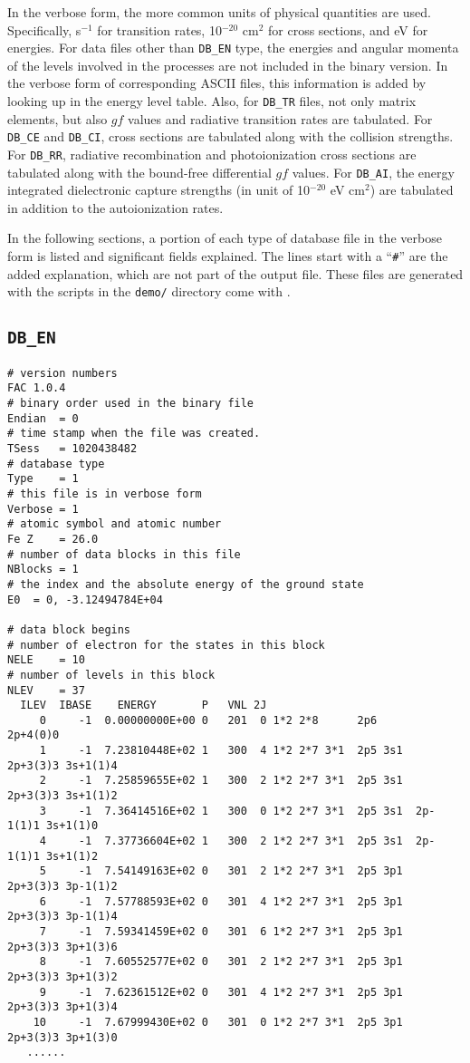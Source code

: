 In the verbose form, the more common units of physical quantities are
used. Specifically, s$^{-1}$ for transition rates, 10$^{-20}$ cm$^2$ for cross
sections, and eV for energies. For data files other than \texttt{DB\_EN} type,
the energies and angular momenta of the levels involved in the processes are
not included in the binary version. In the verbose form of corresponding ASCII
files, this information is added by looking up in the energy level
table. Also, for \texttt{DB\_TR} files, not only matrix elements, but also
$gf$ values and radiative transition rates are tabulated. For \texttt{DB\_CE}
and \texttt{DB\_CI}, cross
sections are tabulated along with the collision strengths. For \texttt{DB\_RR},
radiative recombination and photoionization cross sections are tabulated along
with the bound-free differential $gf$ values. For \texttt{DB\_AI}, the energy
integrated dielectronic capture strengths (in unit of 10$^{-20}$ eV cm$^2$)
are tabulated in addition to the autoionization rates.

In the following sections, a portion of each type of database file in the
verbose form is listed and significant fields explained. The lines start with
a ``\verb|#|'' are the added explanation, which are not part of the output
file. These files are generated with the scripts in the \texttt{demo/}
directory come with \cFAC.

\subsection{\texttt{DB\_EN}}
\begin{verbatim}
# version numbers
FAC 1.0.4
# binary order used in the binary file
Endian	= 0
# time stamp when the file was created.
TSess	= 1020438482
# database type
Type	= 1
# this file is in verbose form
Verbose	= 1
# atomic symbol and atomic number
Fe Z	= 26.0
# number of data blocks in this file
NBlocks	= 1
# the index and the absolute energy of the ground state
E0	= 0, -3.12494784E+04

# data block begins
# number of electron for the states in this block
NELE	= 10
# number of levels in this block
NLEV	= 37
  ILEV  IBASE    ENERGY       P   VNL 2J
     0     -1  0.00000000E+00 0   201  0 1*2 2*8      2p6      2p+4(0)0 
     1     -1  7.23810448E+02 1   300  4 1*2 2*7 3*1  2p5 3s1  2p+3(3)3 3s+1(1)4 
     2     -1  7.25859655E+02 1   300  2 1*2 2*7 3*1  2p5 3s1  2p+3(3)3 3s+1(1)2 
     3     -1  7.36414516E+02 1   300  0 1*2 2*7 3*1  2p5 3s1  2p-1(1)1 3s+1(1)0 
     4     -1  7.37736604E+02 1   300  2 1*2 2*7 3*1  2p5 3s1  2p-1(1)1 3s+1(1)2 
     5     -1  7.54149163E+02 0   301  2 1*2 2*7 3*1  2p5 3p1  2p+3(3)3 3p-1(1)2 
     6     -1  7.57788593E+02 0   301  4 1*2 2*7 3*1  2p5 3p1  2p+3(3)3 3p-1(1)4 
     7     -1  7.59341459E+02 0   301  6 1*2 2*7 3*1  2p5 3p1  2p+3(3)3 3p+1(3)6 
     8     -1  7.60552577E+02 0   301  2 1*2 2*7 3*1  2p5 3p1  2p+3(3)3 3p+1(3)2 
     9     -1  7.62361512E+02 0   301  4 1*2 2*7 3*1  2p5 3p1  2p+3(3)3 3p+1(3)4 
    10     -1  7.67999430E+02 0   301  0 1*2 2*7 3*1  2p5 3p1  2p+3(3)3 3p+1(3)0 
   ......
\end{verbatim}

